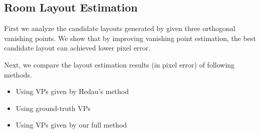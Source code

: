 \subsection{Room Layout Estimation}
\label{sec:5-2}
First we analyze the candidate layouts generated by \cite{Hedau_ICCV2009} given three orthogonal vanishing points. We show that by improving vanishing point estimation, the best candidate layout can achieved lower pixel error.

Next, we compare the layout estimation results (in pixel error) of following methods.
\begin{itemize}
  \item Using VPs given by Hedau's method \cite{Hedau_ICCV2009}
  \item Using ground-truth VPs
  \item Using VPs given by our full method
\end{itemize}

